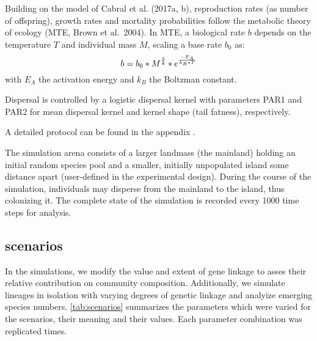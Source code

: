 \documentclass[a4paper]{scrartcl}
\begin{document}
Building on the model of Cabral et al. (2017a, b), reproduction rates (as number of offspring),
growth rates and mortality probabilities follow the metabolic theory
of ecology (MTE, Brown et al.\ 2004). %
In MTE, a biological rate $b$ depends on the temperature $T$ and individual mass $M$, scaling a base rate $b_0$ as:
\begin{equation}
  b=b_0*M^{3\over4}*e^{-{E_A}\over{k_B*T}}
  \label{eq:MTE}
\end{equation}
with $E_A$ the activation energy and $k_B$ the Boltzman constant.

Dispersal is controlled by a logistic dispersal kernel \cite{bullockjamesm.SynthesisEmpiricalPlant2016}
with parameters PAR1 and PAR2
for mean dispersal kernel and kernel shape (tail fatness), respectively.

A detailed protocol can be found in the appendix \cite{grimmStandardProtocolDescribing2006a} \cite{grimmODDProtocolReview2010}.



The simulation arena consists of a larger landmass (the mainland) holding an initial random species pool and a smaller,
initially unpopulated island some distance apart (user-defined in the experimental design).
During the course of the simulation, individuals may disperse from the mainland to the island, thus colonizing it. 
The complete state of the simulation is recorded every 1000 time steps for analysis.

\subsection{scenarios}
In the simulations, we modify the value and extent of
gene linkage
to asses their relative contribution on community composition.
Additionally, we simulate lineages in isolation with varying degrees of genetic linkage
and analyize emerging species numbers.
\cref{tab:scenarios} summarizes the parameters which were varied for the scenarios, their meaning and their values. %
Each parameter combination was replicated %
times.%
\end{document}
